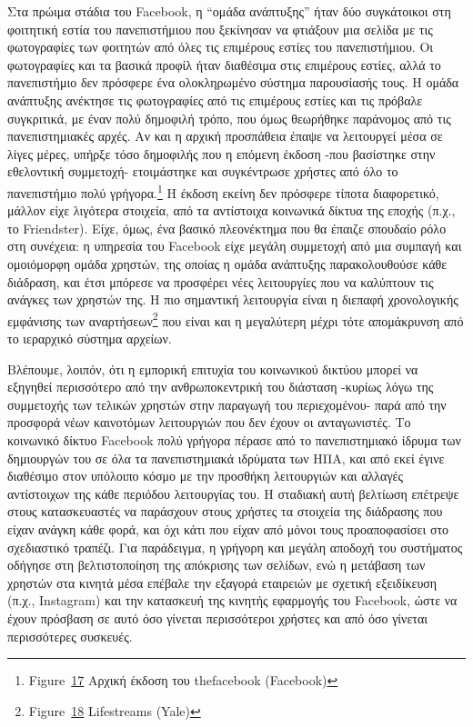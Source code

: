 \documentclass[
]{article}
\begin{document}
Στα πρώιμα στάδια του Facebook, η ``ομάδα ανάπτυξης'' ήταν δύο
συγκάτοικοι στη φοιτητική εστία του πανεπιστήμιου που ξεκίνησαν να
φτιάξουν μια σελίδα με τις φωτογραφίες των φοιτητών από όλες τις
επιμέρους εστίες του πανεπιστήμιου. Οι φωτογραφίες και τα βασικά προφίλ
ήταν διαθέσιμα στις επιμέρους εστίες, αλλά το πανεπιστήμιο δεν πρόσφερε
ένα ολοκληρωμένο σύστημα παρουσίασής τους. Η ομάδα ανάπτυξης ανέκτησε
τις φωτογραφίες από τις επιμέρους εστίες και τις πρόβαλε συγκριτικά, με
έναν πολύ δημοφιλή τρόπο, που όμως θεωρήθηκε παράνομος από τις
πανεπιστημιακές αρχές. Αν και η αρχική προσπάθεια έπαψε να λειτουργεί
μέσα σε λίγες μέρες, υπήρξε τόσο δημοφιλής που η επόμενη έκδοση -που
βασίστηκε στην εθελοντική συμμετοχή- ετοιμάστηκε και συγκέντρωσε χρήστες
από όλο το πανεπιστήμιο πολύ γρήγορα.\footnote{Figure~\protect\hyperlink{fig:facebook1}{17}
  Αρχική έκδοση του thefacebook (Facebook)} Η έκδοση εκείνη δεν πρόσφερε
τίποτα διαφορετικό, μάλλον είχε λιγότερα στοιχεία, από τα αντίστοιχα
κοινωνικά δίκτυα της εποχής (π.χ., το Friendster). Είχε, όμως, ένα
βασικό πλεονέκτημα που θα έπαιζε σπουδαίο ρόλο στη συνέχεια: η υπηρεσία
του Facebook είχε μεγάλη συμμετοχή από μια συμπαγή και ομοιόμορφη ομάδα
χρηστών, της οποίας η ομάδα ανάπτυξης παρακολουθούσε κάθε διάδραση, και
έτσι μπόρεσε να προσφέρει νέες λειτουργίες που να καλύπτουν τις ανάγκες
των χρηστών της. Η πιο σημαντική λειτουργία είναι η διεπαφή χρονολογικής
εμφάνισης των αναρτήσεων\footnote{Figure~\protect\hyperlink{fig:lifestreams}{18}
  Lifestreams (Yale)} που είναι και η μεγαλύτερη μέχρι τότε απομάκρυνση
από το ιεραρχικό σύστημα αρχείων.

Βλέπουμε, λοιπόν, ότι η εμπορική επιτυχία του κοινωνικού δικτύου μπορεί
να εξηγηθεί περισσότερο από την ανθρωποκεντρική του διάσταση -κυρίως
λόγω της συμμετοχής των τελικών χρηστών στην παραγωγή του περιεχομένου-
παρά από την προσφορά νέων καινοτόμων λειτουργιών που δεν έχουν οι
ανταγωνιστές. Το κοινωνικό δίκτυο Facebook πολύ γρήγορα πέρασε από το
πανεπιστημιακό ίδρυμα των δημιουργών του σε όλα τα πανεπιστημιακά
ιδρύματα των ΗΠΑ, και από εκεί έγινε διαθέσιμο στον υπόλοιπο κόσμο με
την προσθήκη λειτουργιών και αλλαγές αντίστοιχων της κάθε περιόδου
λειτουργίας του. Η σταδιακή αυτή βελτίωση επέτρεψε στους κατασκευαστές
να παράσχουν στους χρήστες τα στοιχεία της διάδρασης που είχαν ανάγκη
κάθε φορά, και όχι κάτι που είχαν από μόνοι τους προαποφασίσει στο
σχεδιαστικό τραπέζι. Για παράδειγμα, η γρήγορη και μεγάλη αποδοχή του
συστήματος οδήγησε στη βελτιστοποίηση της απόκρισης των σελίδων, ενώ η
μετάβαση των χρηστών στα κινητά μέσα επέβαλε την εξαγορά εταιρειών με
σχετική εξειδίκευση (π.χ., Ιnstagram) και την κατασκευή της κινητής
εφαρμογής του Facebook, ώστε να έχουν πρόσβαση σε αυτό όσο γίνεται
περισσότεροι χρήστες και από όσο γίνεται περισσότερες συσκευές.
\end{document}

